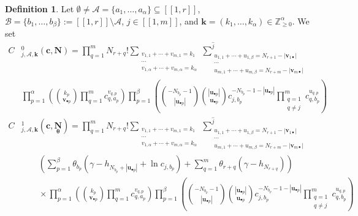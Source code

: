 \documentclass[a4paper]{amsart}
\theoremstyle{remark}
\theoremstyle{definition}
\newtheorem{definition}[theorem]{Definition}
\begin{document}
\begin{definition}
\label{def:C0_C1}
Let $\emptyset \neq \mathcal{A}= \{ a_1,\ldots,a_{\alpha} \}\subseteq [\![ 1,r ]\!]$, $\mathcal{B}= \{ b_1,\ldots,b_{\beta} \} := [\![ 1,r ]\!] \setminus \mathcal{A}$, $j \in [\![ 1,m ]\!]$, and $\mathbf{k}=(k_1,\ldots,k_{\alpha}) \in \mathbb{Z}_{\geq 0}^{\alpha}$. We set
\begin{align}
    C&^0_{j,\mathcal{A},\mathbf{k}}(\mathbf{c},\mathbf{N}) = \prod_{q=1}^{m} N_{r+q}! \sum_{\substack{v_{1,1}+\cdots+v_{m,1}=k_1 \\ \cdots \\ v_{1,\alpha}+\cdots+v_{m,\alpha} = k_{\alpha}}} \sum^{\widehat{j}}_{\substack{u_{1,1}+\cdots+u_{1,\beta}=N_{r+1}-|\mathbf{v}_{1 \bullet}| \\ \cdots \\ u_{m,1}+\cdots+u_{m,\beta}=N_{r+m}-|\mathbf{v}_{m \bullet}|}} \label{eq:formula_C0} \\
    & \prod_{p=1}^{\alpha} \left( \binom{k_p}{\mathbf{v}_{\bullet p}} \prod_{q=1}^{m} c_{q,a_p}^{v_{q,p}} \right) \prod_{p=1}^{\beta} \left( \binom{-N_{b_p}-1}{|\mathbf{u}_{\bullet p}|} \binom{|\mathbf{u}_{\bullet p}|}{\mathbf{u}_{\bullet p}} c_{j,b_p}^{-N_{b_p}-1-|\mathbf{u}_{\bullet p}|} \prod_{\substack{q=1 \\ q \neq j}}^{m} c_{q,b_p}^{u_{q,p}} \right) \nonumber \\
    C&_{j,\mathcal{A},\mathbf{k}}^1(\mathbf{c},\underset{\bm{\theta}}{\mathbf{N}}) = \prod_{q=1}^{m} N_{r+q}! \sum_{\substack{v_{1,1}+\cdots+v_{m,1}=k_1 \\ \cdots \\ v_{1,\alpha}+\cdots+v_{m,\alpha} = k_{\alpha}}} \sum^{\widehat{j}}_{\substack{u_{1,1}+\cdots+u_{1,\beta}=N_{r+1}-|\mathbf{v}_{1 \bullet}| \\ \cdots \\ u_{m,1}+\cdots+u_{m,\beta}=N_{r+m}-|\mathbf{v}_{m \bullet}|}} \label{eq:formula_C1} \\
    & \qquad \left( \sum_{p=1}^{\beta} \theta_{b_p} (\gamma-h_{N_{b_p}+|\mathbf{u}_{\bullet p}|}+\ln c_{j,{b_p}}) + \sum_{q=1}^{m} \theta_{r+q} (\gamma-h_{N_{r+q}}) \right) \nonumber \\
    & \qquad \times \prod_{p=1}^{\alpha} \left( \binom{k_p}{\mathbf{v}_{\bullet p}} \prod_{q=1}^{m} c_{q,a_p}^{v_{q,p}} \right) \prod_{p=1}^{\beta} \left( \binom{-N_{b_p}-1}{|\mathbf{u}_{\bullet p}|} \binom{|\mathbf{u}_{\bullet p}|}{\mathbf{u}_{\bullet p}} c_{j,b_p}^{-N_{b_p}-1-|\mathbf{u}_{\bullet p}|} \prod_{\substack{q=1 \\ q \neq j}}^{m} c_{q,b_p}^{u_{q,p}} \right) \nonumber \\

\end{align}
\end{definition}
\end{document}
